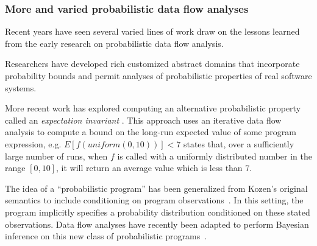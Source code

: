 \subsubsection{More and varied probabilistic data flow analyses}
Recent years have seen several varied lines of work draw on
the lessons learned from the early research on probabilistic
data flow analysis.

Researchers have developed rich customized abstract domains that 
incorporate probability bounds \cite{mardziel2013dynamic,adje2014static}
and permit analyses of probabilistic properties of real software systems.

More recent work has explored computing an alternative probabilistic
property called an {\sl expectation invariant} \cite{chakarov2014expectation}.
This approach uses an iterative data flow analysis to 
compute a bound on the long-run expected value of
some program expression, e.g. $E[f(\mathit{uniform}(0,10))] < 7$ states that,
over a sufficiently large number of runs, when $f$ is called with
a uniformly distributed number in the range $[0,10]$, it will return
an average value which is less than 7.

The idea of a ``probabilistic program'' has been generalized from
Kozen's original semantics to include conditioning on program
observations~\cite{Gordon2014}.
In this setting, the program implicitly specifies a probability 
distribution conditioned on these stated observations.
Data flow analyses have recently been adapted to perform Bayesian
inference on this new class of probabilistic 
programs~\cite{claret2013bayesian}.  
